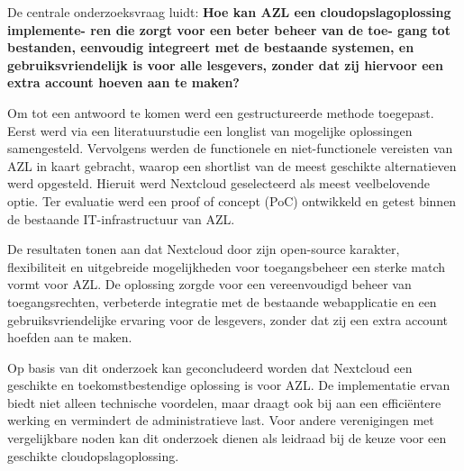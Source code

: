 De centrale onderzoeksvraag luidt: \textbf{Hoe kan AZL een cloudopslagoplossing implemente- ren die zorgt voor een beter beheer van de toe- gang tot bestanden, eenvoudig integreert met de bestaande systemen, en gebruiksvriendelijk is voor alle lesgevers, zonder dat zij hiervoor een extra account hoeven aan te maken?}

Om tot een antwoord te komen werd een gestructureerde methode toegepast. Eerst werd via een literatuurstudie een longlist van mogelijke oplossingen samengesteld. 
Vervolgens werden de functionele en niet-functionele vereisten van AZL in kaart gebracht, waarop een shortlist van de meest geschikte alternatieven werd opgesteld. 
Hieruit werd Nextcloud geselecteerd als meest veelbelovende optie. Ter evaluatie werd een proof of concept (PoC) ontwikkeld en getest binnen de 
bestaande IT-infrastructuur van AZL.

De resultaten tonen aan dat Nextcloud door zijn open-source karakter, flexibiliteit en uitgebreide mogelijkheden voor toegangsbeheer een sterke match vormt voor AZL. 
De oplossing zorgde voor een vereenvoudigd beheer van toegangsrechten, verbeterde integratie met de bestaande webapplicatie en een gebruiksvriendelijke ervaring voor 
de lesgevers, zonder dat zij een extra account hoefden aan te maken.

Op basis van dit onderzoek kan geconcludeerd worden dat Nextcloud een geschikte en toekomstbestendige oplossing is voor AZL. De implementatie ervan biedt niet 
alleen technische voordelen, maar draagt ook bij aan een efficiëntere werking en vermindert de administratieve last. Voor andere verenigingen met vergelijkbare 
noden kan dit onderzoek dienen als leidraad bij de keuze voor een geschikte cloudopslagoplossing.
